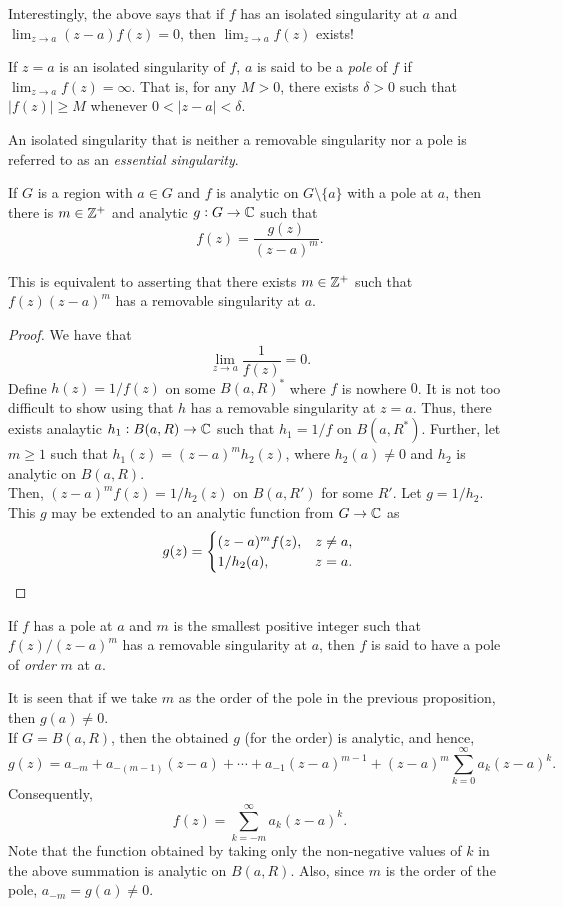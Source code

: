 	Interestingly, the above says that if $f$ has an isolated singularity at $a$ and $\lim_{z \to a} (z-a) f(z) = 0$, then $\lim_{z \to a} f(z)$ exists!

	\begin{fdef}[Pole]
		If $z = a$ is an isolated singularity of $f$, $a$ is said to be a \emph{pole} of $f$ if $\lim_{z \to a} f(z) = \infty$. That is, for any $M > 0$, there exists $\delta > 0$ such that $|f(z)| \ge M$ whenever $0 < |z-a| < \delta$.
	\end{fdef}

	An isolated singularity that is neither a removable singularity nor a pole is referred to as an \emph{essential singularity}.

	\begin{prop}
		If $G$ is a region with $a \in G$ and $f$ is analytic on $G \setminus \{a\}$ with a pole at $a$, then there is $m \in \mathbb{Z}^+$ and analytic $g : G \to \mathbb{C}$ such that
		\[ f(z) = \frac{g(z)}{(z-a)^m}. \]
	\end{prop}
	
	This is equivalent to asserting that there exists $m \in \mathbb{Z}^+$ such that $f(z) (z-a)^m$ has a removable singularity at $a$.

	\begin{proof}
		We have that
		\[ \lim_{z \to a} \frac{1}{f(z)} = 0. \]
		Define $h(z) = 1/f(z)$ on some $B(a,R)^*$ where $f$ is nowhere $0$. It is not too difficult to show using  that $h$ has a removable singularity at $z = a$. Thus, there exists analaytic $h_1 : B(a,R) \to \mathbb{C}$ such that $h_1 = 1/f$ on $B(a,R^*)$. Further, let $m \ge 1$ such that $h_1(z) = (z-a)^m h_2(z)$, where $h_2(a) \ne 0$ and $h_2$ is analytic on $B(a,R)$.\\
		Then, $(z-a)^m f(z) = 1/h_2(z)$ on $B(a,R')$ for some $R'$. Let $g = 1/h_2$. This $g$ may be extended to an analytic function from $G \to \mathbb{C}$ as
		\[ g(z) = \begin{cases} (z-a)^m f(z), & z \ne a, \\ 1/h_2(a), & z = a. \end{cases} \qedhere \]
	\end{proof}

	\begin{definition}
		If $f$ has a pole at $a$ and $m$ is the smallest positive integer such that $f(z)/(z-a)^m$ has a removable singularity at $a$, then $f$ is said to have a pole of \emph{order} $m$ at $a$.
	\end{definition}

	It is seen that if we take $m$ as the order of the pole in the previous proposition, then $g(a) \ne 0$.\\
	If $G = B(a,R)$, then the obtained $g$ (for the order) is analytic, and hence,
	\[ g(z) = a_{-m} + a_{-(m-1)}(z-a) + \cdots + a_{-1} (z-a)^{m-1} + (z-a)^m \sum_{k=0}^\infty a_k (z-a)^k. \]
	Consequently,
	\[ f(z) = \sum_{k = -m}^{\infty} a_k (z-a)^k. \]
	Note that the function obtained by taking only the non-negative values of $k$ in the above summation is analytic on $B(a,R)$. Also, since $m$ is the order of the pole, $a_{-m} = g(a) \ne 0$.

